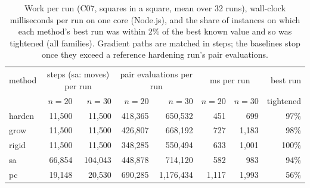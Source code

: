 \begin{table}[ht]\centering\small
\begin{tabular}{lrrrrrrr}
\toprule
method & \multicolumn{2}{c}{steps (sa: moves) per run} & \multicolumn{2}{c}{pair evaluations per run} & \multicolumn{2}{c}{ms per run} & best run \\
 & $n=20$ & $n=30$ & $n=20$ & $n=30$ & $n=20$ & $n=30$ & tightened \\
\midrule
harden & 11{,}500 & 11{,}500 & 418{,}365 & 650{,}532 & 451 & 699 & 97\% \\
grow & 11{,}500 & 11{,}500 & 426{,}807 & 668{,}192 & 727 & 1{,}183 & 98\% \\
rigid & 11{,}500 & 11{,}500 & 348{,}285 & 550{,}494 & 633 & 1{,}001 & 100\% \\
sa & 66{,}854 & 104{,}043 & 448{,}878 & 714{,}120 & 582 & 983 & 94\% \\
pc & 19{,}148 & 20{,}530 & 690{,}285 & 1{,}176{,}434 & 1{,}117 & 1{,}993 & 56\% \\
\bottomrule
\end{tabular}
\caption{Work per run (C07, squares in a square, mean over 32 runs), wall-clock milliseconds per run on one core (Node.js), and the share of instances on which each method's best run was within 2\% of the best known value and so was tightened (all families). Gradient paths are matched in steps; the baselines stop once they exceed a reference hardening run's pair evaluations.}\label{tab:diag}
\end{table}
